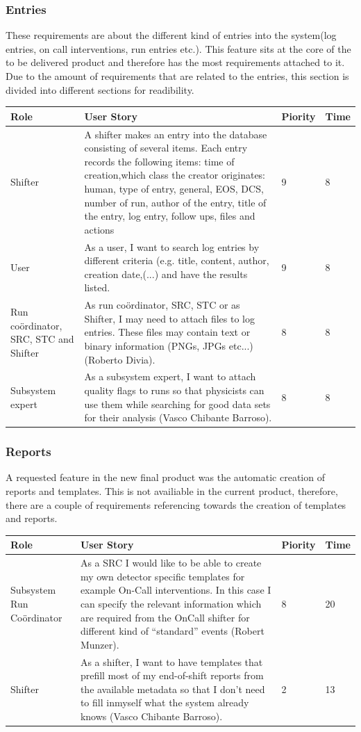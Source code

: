 \documentclass[paper=a4, fontsize=11pt,twoside]{scrartcl}	%
\begin{document}
\subsubsection{Entries}
These requirements are about the different kind of entries into the system(log entries, on call interventions, run entries etc.). This feature sits at the core of the to be delivered product and therefore has the most requirements attached to it. Due to the amount of requirements that are related to the entries, this section is divided into different sections for readibility. 

\begin{longtable}{ | p{3cm} | p{8cm} | p{1.5cm} | l |}
\hline
Role & User Story & Piority & Time \\ \hline
Shifter &  A shifter makes an entry into the database consisting of several items. Each entry records the following items: time of creation,which class the creator originates: human, type of entry, general, EOS, DCS, number of run, author of the entry, title of the entry, log entry, follow ups, files and actions & 9 & 8 \\ \hline
User & As a user, I want to search log entries by different criteria (e.g. title, content, author, creation date,(...) and have the results listed. & 9 & 8 \\ \hline
Run coördinator, SRC, STC and Shifter& As run coördinator, SRC, STC or as Shifter, I may need to attach files to log entries. These files may contain text or binary information (PNGs, JPGs etc...) (Roberto Divia). & 8 & 8 \\ \hline
Subsystem expert & As a subsystem expert, I want to attach quality flags to runs so that
physicists can use them while searching for good data sets for their analysis (Vasco Chibante Barroso). & 8 & 8 \\ \hline
\end{longtable}


\subsubsection{Reports}
A requested feature in the new final product was the automatic creation of reports and templates. This is not availiable in the current product, therefore, there are a couple of requirements referencing towards the creation of templates and reports.
\begin{longtable}{ | p{2cm} | p{8cm} | p{1.5cm} | l |}
\hline
Role & User Story & Piority & Time \\ \hline
Subsystem Run Coördinator & As a SRC I would like to be able to create my own detector specific templates for example On-Call interventions. In this case I can specify the relevant information which are required from the OnCall shifter for different kind of “standard” events (Robert Munzer). & 8 & 20 \\ \hline
Shifter &  As a shifter, I want to have templates that prefill most of my end-of-shift reports from the available metadata so that I don’t need to fill inmyself what the system already knows (Vasco Chibante Barroso). & 2 & 13 \\ \hline
\end{longtable}
\end{document}
